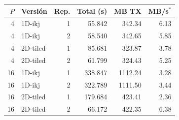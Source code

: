 \begin{center}
\small
\begin{tabular}{rlrrrr}
\toprule
$P$ & Versión & Rep. & Total (s) & MB TX & MB/s$^{*}$ \\
\midrule
4 & 1D-ikj & 1 & 55.842 & 342.34 & 6.13 \\
4 & 1D-ikj & 2 & 58.540 & 342.65 & 5.85 \\
4 & 2D-tiled & 1 & 85.681 & 323.87 & 3.78 \\
4 & 2D-tiled & 2 & 61.799 & 324.43 & 5.25 \\
16 & 1D-ikj & 1 & 338.847 & 1112.24 & 3.28 \\
16 & 1D-ikj & 2 & 322.789 & 1111.50 & 3.44 \\
16 & 2D-tiled & 1 & 179.684 & 423.41 & 2.36 \\
16 & 2D-tiled & 2 & 66.172 & 422.35 & 6.38 \\
\bottomrule
\end{tabular}
\end{center}

